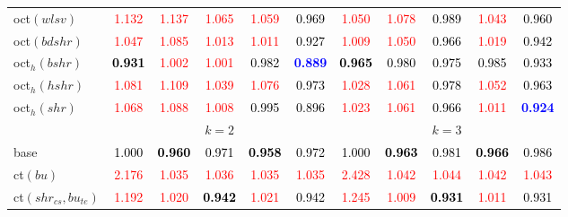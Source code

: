 \begin{tabular}[t]{l|>{}cccc>{}c|ccccc}
oct$(wlsv)$ & \textcolor{red}{1.132} & \textcolor{red}{1.137} & \textcolor{red}{1.065} & \textcolor{red}{1.059} & \textcolor{black}{0.969} & \textcolor{red}{1.050} & \textcolor{red}{1.078} & \textcolor{black}{0.989} & \textcolor{red}{1.043} & \textcolor{black}{0.960}\\
oct$(bdshr)$ & \textcolor{red}{1.047} & \textcolor{red}{1.085} & \textcolor{red}{1.013} & \textcolor{red}{1.011} & \textcolor{black}{0.927} & \textcolor{red}{1.009} & \textcolor{red}{1.050} & \textcolor{black}{0.966} & \textcolor{red}{1.019} & \textcolor{black}{0.942}\\
oct$_h(bshr)$ & \textcolor{black}{\textbf{0.931}} & \textcolor{red}{1.002} & \textcolor{red}{1.001} & \textcolor{black}{0.982} & \textcolor{blue}{\textbf{0.889}} & \textcolor{black}{\textbf{0.965}} & \textcolor{black}{0.980} & \textcolor{black}{0.975} & \textcolor{black}{0.985} & \textcolor{black}{0.933}\\
oct$_h(hshr)$ & \textcolor{red}{1.081} & \textcolor{red}{1.109} & \textcolor{red}{1.039} & \textcolor{red}{1.076} & \textcolor{black}{0.973} & \textcolor{red}{1.028} & \textcolor{red}{1.061} & \textcolor{black}{0.978} & \textcolor{red}{1.052} & \textcolor{black}{0.963}\\
oct$_h(shr)$ & \textcolor{red}{1.068} & \textcolor{red}{1.088} & \textcolor{red}{1.008} & \textcolor{black}{0.995} & \textcolor{black}{0.896} & \textcolor{red}{1.023} & \textcolor{red}{1.061} & \textcolor{black}{0.966} & \textcolor{red}{1.011} & \textcolor{blue}{\textbf{0.924}}\\
\addlinespace[0.3em]
\multicolumn{1}{c}{} & \multicolumn{5}{c}{\textbf{$k = 2$}} & \multicolumn{5}{c}{\textbf{$k = 3$}}\\
base & \textcolor{black}{1.000} & \textcolor{black}{\textbf{0.960}} & \textcolor{black}{0.971} & \textcolor{black}{\textbf{0.958}} & \textcolor{black}{0.972} & \textcolor{black}{1.000} & \textcolor{black}{\textbf{0.963}} & \textcolor{black}{0.981} & \textcolor{black}{\textbf{0.966}} & \textcolor{black}{0.986}\\
ct$(bu)$ & \textcolor{red}{2.176} & \textcolor{red}{1.035} & \textcolor{red}{1.036} & \textcolor{red}{1.035} & \textcolor{red}{1.035} & \textcolor{red}{2.428} & \textcolor{red}{1.042} & \textcolor{red}{1.044} & \textcolor{red}{1.042} & \textcolor{red}{1.043}\\
ct$(shr_{cs}, bu_{te})$ & \textcolor{red}{1.192} & \textcolor{red}{1.020} & \textcolor{black}{\textbf{0.942}} & \textcolor{red}{1.021} & \textcolor{black}{0.942} & \textcolor{red}{1.245} & \textcolor{red}{1.009} & \textcolor{black}{\textbf{0.931}} & \textcolor{red}{1.011} & \textcolor{black}{0.931}\\

\end{tabular}
